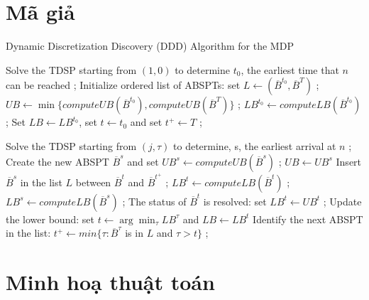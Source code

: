 \documentclass[../main.tex]{subfiles}
\begin{document}
\section{Mã giả}\label{muxe3-giux1ea3}

\begin{algorithm}[H]

\caption{Dynamic Discretization Discovery (DDD) Algorithm for the MDP}
\label{algo:1}
\begin{algorithmic}

\State Solve the TDSP starting from $(1, 0)$ to determine $t_0$, the earliest time that $n$ can be reached ;
\State Initialize ordered list of ABSPTs: set $L \leftarrow (\overline{B}^{t_0}, \overline{B}^{T})$  ;
\State $UB \leftarrow \min\{ computeUB(\overline{B}^{t_0}), computeUB(\overline{B}^{T})\}$ ;
\State $LB^{t_0} \leftarrow computeLB(\overline{B}^{t_0})$ ;
\State Set $LB \leftarrow LB^{t_0}$, set $t \leftarrow t_0$ and set $t^+ \leftarrow T$ ;

        \State Solve the TDSP starting from $(j, \tau)$ to determine, s, the earliest arrival at $n$ ;
        \State Create the new ABSPT $\overline{B}^s$ and set $UB^s \leftarrow computeUB(\overline{B}^s)$ ;
            \State $UB \leftarrow UB^s$
        \EndIf
        \State Insert $\overline{B}^s$ in the list $L$ between $\overline{B}^t$ and $\overline{B}^{t^+}$ ;
        \State $LB^t \leftarrow computeLB(\overline{B}^t)$ ;
        \State $LB^s \leftarrow computeLB(\overline{B}^s)$ ;
    \Else
        \State The status of $\overline{B}^t$ is resolved: set $LB^t \leftarrow UB^t$ ;
    \EndIf
    \State Update the lower bound: set $t \leftarrow \arg\min_{\tau}LB^{\tau}$ and $LB\leftarrow LB^t$ 
    \State Identify the next ABSPT in the list: $t^+ \leftarrow min\{\tau : \overline{B}^{\tau}$ is in $L$ and $\tau > t \}$ ;
\EndWhile
  
  \end{algorithmic}
\end{algorithm}

\section{Minh hoạ thuật toán}\label{minh-houx1ea1-thuux1eadt-touxe1n}
\end{document}
